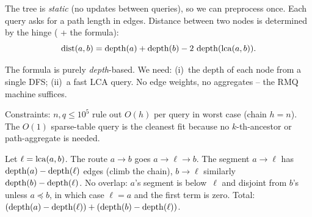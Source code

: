 The tree is \emph{static} (no updates between queries), so we can
preprocess once.  Each query asks for a path length in edges.  Distance
between two nodes is determined by the hinge ( +
the formula):
\[
  \operatorname{dist}(a,b) = \operatorname{depth}(a) + \operatorname{depth}(b) - 2\,\operatorname{depth}(\operatorname{lca}(a,b)).
\]

\begin{observation}
The formula is purely \emph{depth}-based.  We need: (i)~the depth of each
node from a single DFS; (ii)~a fast LCA query.  No edge weights, no
aggregates -- the RMQ machine suffices.
\end{observation}
\begin{observation}
Constraints: \(n,q\le 10^5\) rule out \(O(h)\) per query in worst case
(chain \(h = n\)).  The \(O(1)\) sparse-table query is the cleanest fit
because no \(k\)-th-ancestor or path-aggregate is needed.
\end{observation}


\begin{proofbox}
Let \(\ell = \operatorname{lca}(a,b)\).  The route \(a \to b\) goes \(a\to\ell\to b\).
The segment \(a\to\ell\) has \(\operatorname{depth}(a)-\operatorname{depth}(\ell)\) edges (climb the
chain), \(b\to\ell\) similarly \(\operatorname{depth}(b)-\operatorname{depth}(\ell)\).  No
overlap: \(a\)'s segment is below~\(\ell\) and disjoint from \(b\)'s
unless \(a \preceq b\), in which case \(\ell = a\) and the first term is
zero.  Total: \((\operatorname{depth}(a)-\operatorname{depth}(\ell)) + (\operatorname{depth}(b)-\operatorname{depth}(\ell))\).
\end{proofbox}

